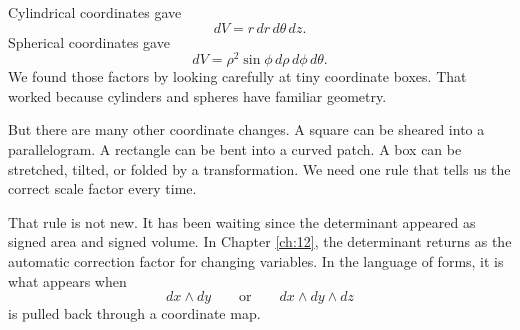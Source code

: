 Cylindrical coordinates gave
\[
    dV=r\,dr\,d\theta\,dz.
\]
Spherical coordinates gave
\[
    dV=\rho^2\sin\phi\,d\rho\,d\phi\,d\theta.
\]
We found those factors by looking carefully at tiny coordinate boxes.  That worked
because cylinders and spheres have familiar geometry.

But there are many other coordinate changes.  A square can be sheared into a
parallelogram.  A rectangle can be bent into a curved patch.  A box can be stretched,
tilted, or folded by a transformation.  We need one rule that tells us the correct scale
factor every time.

That rule is not new.  It has been waiting since the determinant appeared as signed
area and signed volume.  In Chapter \ref{ch:12}, the determinant returns as the
automatic correction factor for changing variables.  In the language of forms, it is what
appears when
\[
    dx\wedge dy
    \qquad\text{or}\qquad
    dx\wedge dy\wedge dz
\]
is pulled back through a coordinate map.
